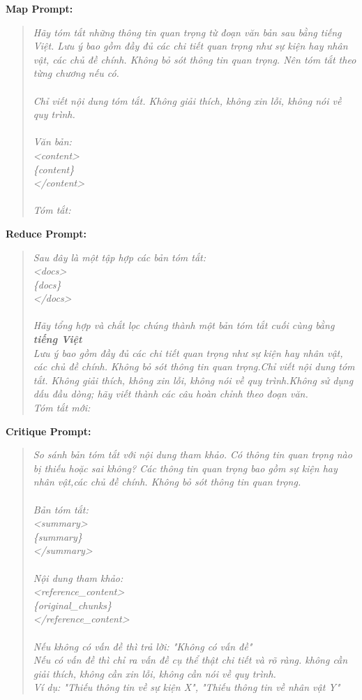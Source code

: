 \documentclass[11pt]{article}
\begin{document}
\textbf{Map Prompt:}
\begin{quote}
\textit{Hãy tóm tắt những thông tin quan trọng từ đoạn văn bản sau bằng tiếng Việt.
Lưu ý bao gồm đầy đủ các chi tiết quan trọng như sự kiện hay nhân vật, các chủ đề chính. Không bỏ sót thông tin quan trọng. Nên tóm tắt theo từng chương nếu có.\\
\\
Chỉ viết nội dung tóm tắt. Không giải thích, không xin lỗi, không nói về quy trình.\\
\\
Văn bản:\\
<content>\\
\{content\}\\
</content>\\
\\
Tóm tắt:}
\end{quote}

\textbf{Reduce Prompt:}
\begin{quote}
\textit{Sau đây là một tập hợp các bản tóm tắt:\\
<docs>\\
\{docs\}\\
</docs>\\
\\
Hãy tổng hợp và chắt lọc chúng thành một bản tóm tắt cuối cùng bằng \textbf{tiếng Việt}\\
Lưu ý bao gồm đầy đủ các chi tiết quan trọng như sự kiện hay nhân vật, các chủ đề chính. Không bỏ sót thông tin quan trọng.Chỉ viết nội dung tóm tắt. Không giải thích, không xin lỗi, không nói về quy trình.Không sử dụng dấu đầu dòng; hãy viết thành các câu hoàn chỉnh theo đoạn văn.\\
Tóm tắt mới:}
\end{quote}

\textbf{Critique Prompt:}
\begin{quote}
\textit{So sánh bản tóm tắt với nội dung tham khảo. Có thông tin quan trọng nào bị thiếu hoặc sai không?
Các thông tin quan trọng bao gồm sự kiện hay nhân vật,các chủ đề chính. Không bỏ sót thông tin quan trọng.\\
\\
Bản tóm tắt:\\
<summary>\\
\{summary\}\\
</summary>\\
\\
Nội dung tham khảo:\\
<reference\_content>\\
\{original\_chunks\}\\
</reference\_content>\\
\\
Nếu không có vấn đề thì trả lời: "Không có vấn đề"\\
Nếu có vấn đề thì chỉ ra vấn đề cụ thể thật chi tiết và rõ ràng. không cần giải thích, không cần xin lỗi, không cần nói về quy trình.\\
Ví dụ: "Thiếu thông tin về sự kiện X", "Thiếu thông tin về nhân vật Y"}
\end{quote}
\end{document}
